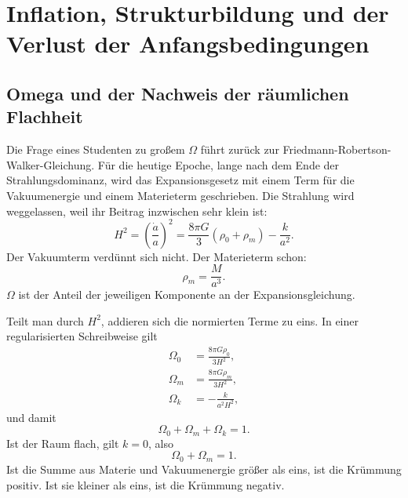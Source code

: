 \chapter{Inflation, Strukturbildung und der Verlust der Anfangsbedingungen}

\section{Omega und der Nachweis der räumlichen Flachheit}

Die Frage eines Studenten zu großem \(\Omega\) führt zurück zur Friedmann-Robertson-Walker-Gleichung. Für die heutige Epoche, lange nach dem Ende der Strahlungsdominanz, wird das Expansionsgesetz mit einem Term für die Vakuumenergie und einem Materieterm geschrieben. Die Strahlung wird weggelassen, weil ihr Beitrag inzwischen sehr klein ist:
\begin{equation}
H^2=\left(\frac{\dot a}{a}\right)^2=\frac{8\pi G}{3}\left(\rho_0+\rho_m\right)-\frac{k}{a^2}.
\end{equation}
Der Vakuumterm verdünnt sich nicht. Der Materieterm schon:
\begin{equation}
\rho_m=\frac{M}{a^3}.
\end{equation}
\(\Omega\) ist der Anteil der jeweiligen Komponente an der Expansionsgleichung.

Teilt man durch \(H^2\), addieren sich die normierten Terme zu eins. In einer regularisierten Schreibweise gilt
\begin{equation}
\begin{aligned}
\Omega_0&=\frac{8\pi G\rho_0}{3H^2},\\
\Omega_m&=\frac{8\pi G\rho_m}{3H^2},\\
\Omega_k&=-\frac{k}{a^2H^2},
\end{aligned}
\end{equation}
und damit
\begin{equation}
\Omega_0+\Omega_m+\Omega_k=1.
\end{equation}
Ist der Raum flach, gilt \(k=0\), also
\begin{equation}
\Omega_0+\Omega_m=1.
\end{equation}
Ist die Summe aus Materie und Vakuumenergie größer als eins, ist die Krümmung positiv. Ist sie kleiner als eins, ist die Krümmung negativ.

